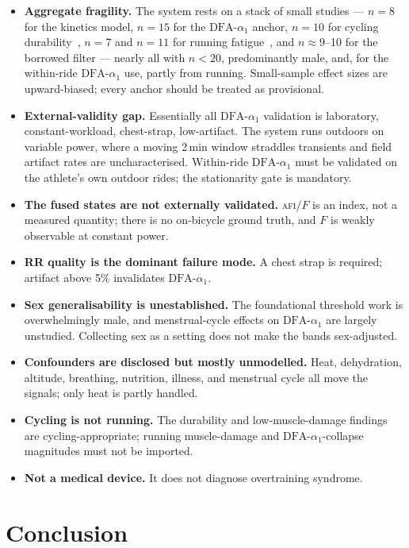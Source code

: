 \documentclass[11pt]{article}
\newcommand{\afi}{\textup{\textsc{afi}}}
\newcommand{\aone}{\ensuremath{\text{DFA-}\alpha_1}}
\newcommand{\Fstate}{\ensuremath{F}}
\begin{document}
\begin{itemize}
\item \textbf{Aggregate fragility.} The system rests on a stack of small studies --- $n=8$ for the kinetics model, $n=15$ for the $\aone$ anchor, $n=10$ for cycling durability~\cite{rogers2025}, $n=7$ and $n=11$ for running fatigue~\cite{ultra,marathon}, and $n\approx9$--10 for the borrowed filter --- nearly all with $n<20$, predominantly male, and, for the within-ride $\aone$ use, partly from running. Small-sample effect sizes are upward-biased; every anchor should be treated as provisional.
\item \textbf{External-validity gap.} Essentially all $\aone$ validation is laboratory, constant-workload, chest-strap, low-artifact. The system runs outdoors on variable power, where a moving 2\,min window straddles transients and field artifact rates are uncharacterised. Within-ride $\aone$ must be validated on the athlete's own outdoor rides; the stationarity gate is mandatory.
\item \textbf{The fused states are not externally validated.} \afi{}/$\Fstate$ is an index, not a measured quantity; there is no on-bicycle ground truth, and $\Fstate$ is weakly observable at constant power.
\item \textbf{RR quality is the dominant failure mode.} A chest strap is required; artifact above 5\% invalidates $\aone$.
\item \textbf{Sex generalisability is unestablished.} The foundational threshold work is overwhelmingly male, and menstrual-cycle effects on $\aone$ are largely unstudied. Collecting sex as a setting does not make the bands sex-adjusted.
\item \textbf{Confounders are disclosed but mostly unmodelled.} Heat, dehydration, altitude, breathing, nutrition, illness, and menstrual cycle all move the signals; only heat is partly handled.
\item \textbf{Cycling is not running.} The durability and low-muscle-damage findings are cycling-appropriate; running muscle-damage and $\aone$-collapse magnitudes must not be imported.
\item \textbf{Not a medical device.} It does not diagnose overtraining syndrome.
\end{itemize}

\section{Conclusion}\label{sec:conclusion}
\end{document}
